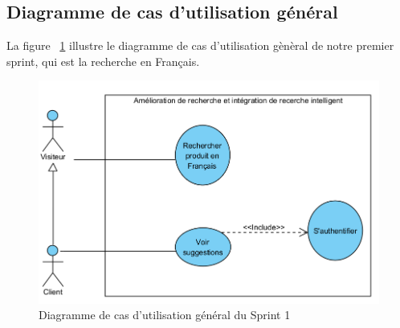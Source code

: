 \subsection{Diagramme de cas d'utilisation général}
\noindent
La figure ~\ref{fig:recherchefrancais} illustre le diagramme de cas d'utilisation gènèral de notre premier sprint, qui est la recherche en Français.

\begin{figure}[H]
	\centering
	\includegraphics[width=1\textwidth]{logos/cusprint1.png}
	\caption{Diagramme de cas d'utilisation général du Sprint 1}
	\label{fig:recherchefrancais}
\end{figure}

